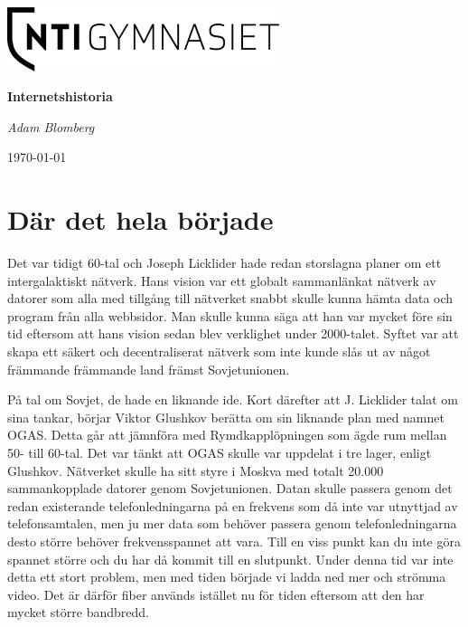 \documentclass[a4paper,11pt]{article}
\begin{document}
\begin{titlepage}
	\centering
	\includegraphics[width=0.6\textwidth]{Bilder/logo.png}\par\vspace{1cm}
	\vspace{1.5cm}
	{\huge\bfseries Internetshistoria\par}
	\vspace{2cm}
	{\Large\itshape Adam Blomberg\par}
	\vfill
{}
	\vfill

	{\large \today\par}
\end{titlepage}

\tableofcontents
\newpage

\section{Där det hela började}

Det var tidigt 60-tal och Joseph Licklider hade redan storslagna planer om ett intergalaktiskt nätverk. Hans vision var ett globalt sammanlänkat nätverk av datorer som alla med tillgång till nätverket snabbt skulle kunna hämta data och program från alla webbsidor. Man skulle kunna säga att han var mycket före sin tid eftersom att hans vision sedan blev verklighet under 2000-talet. Syftet var att skapa ett säkert och decentraliserat nätverk som inte kunde slås ut av något främmande främmande land främst Sovjetunionen.

På tal om Sovjet, de hade en liknande ide. Kort därefter att J. Licklider talat om sina tankar, börjar Viktor Glushkov berätta om sin liknande plan med namnet OGAS. Detta går att jämnföra med Rymdkapplöpningen som ägde rum mellan 50- till 60-tal. Det var tänkt att OGAS skulle var uppdelat i tre lager, enligt Glushkov. Nätverket skulle ha sitt styre i Moskva med totalt 20.000 sammankopplade datorer genom Sovjetunionen. Datan skulle passera genom det redan existerande telefonledningarna på en frekvens som då inte var utnyttjad av telefonsamtalen, men ju mer data som behöver passera genom telefonledningarna desto större behöver frekvensspannet att vara. Till en viss punkt kan du inte göra spannet större och du har då kommit till en slutpunkt. Under denna tid var inte detta ett stort problem, men med tiden började vi ladda ned mer och strömma video. Det är därför fiber används istället nu för tiden eftersom att den har mycket större bandbredd.
\end{document}
